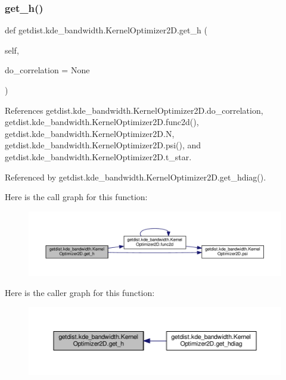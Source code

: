 \subsubsection{\texorpdfstring{get\+\_\+h()}{get\_h()}}
{\footnotesize\ttfamily def getdist.\+kde\+\_\+bandwidth.\+Kernel\+Optimizer2\+D.\+get\+\_\+h (\begin{DoxyParamCaption}\item[{}]{self,  }\item[{}]{do\+\_\+correlation = {\ttfamily None} }\end{DoxyParamCaption})}



References getdist.\+kde\+\_\+bandwidth.\+Kernel\+Optimizer2\+D.\+do\+\_\+correlation, getdist.\+kde\+\_\+bandwidth.\+Kernel\+Optimizer2\+D.\+func2d(), getdist.\+kde\+\_\+bandwidth.\+Kernel\+Optimizer2\+D.\+N, getdist.\+kde\+\_\+bandwidth.\+Kernel\+Optimizer2\+D.\+psi(), and getdist.\+kde\+\_\+bandwidth.\+Kernel\+Optimizer2\+D.\+t\+\_\+star.



Referenced by getdist.\+kde\+\_\+bandwidth.\+Kernel\+Optimizer2\+D.\+get\+\_\+hdiag().

Here is the call graph for this function\+:
\nopagebreak
\begin{figure}[H]
\begin{center}
\leavevmode
\includegraphics[width=350pt]{classgetdist_1_1kde__bandwidth_1_1KernelOptimizer2D_afd388bc2eafda3fe7f8dca0c4dbd2157_cgraph}
\end{center}
\end{figure}
Here is the caller graph for this function\+:
\nopagebreak
\begin{figure}[H]
\begin{center}
\leavevmode
\includegraphics[width=350pt]{classgetdist_1_1kde__bandwidth_1_1KernelOptimizer2D_afd388bc2eafda3fe7f8dca0c4dbd2157_icgraph}
\end{center}
\end{figure}
\mbox{\label{classgetdist_1_1kde__bandwidth_1_1KernelOptimizer2D_ad35e13b353a66f02b5c980e5b69b25ad}} 
